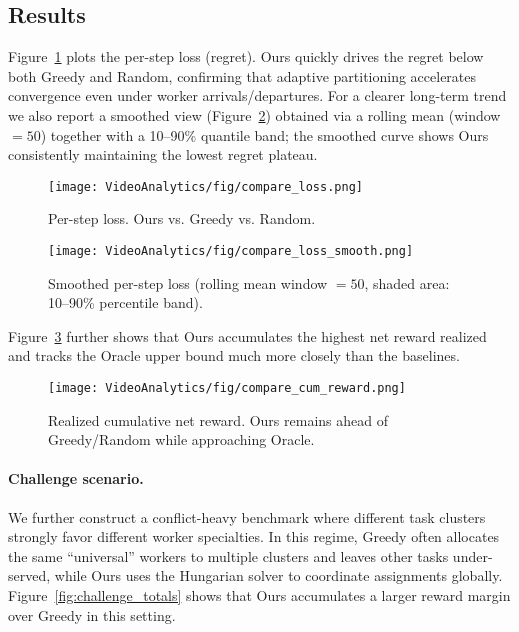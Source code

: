 \subsection{Results}

Figure~\ref{fig:loss} plots the per-step loss (regret). Ours quickly drives the regret below both Greedy and Random, confirming that adaptive partitioning accelerates convergence even under worker arrivals/departures. For a clearer long-term trend we also report a smoothed view (Figure~\ref{fig:loss_smooth}) obtained via a rolling mean (window $=50$) together with a 10--90\% quantile band; the smoothed curve shows Ours consistently maintaining the lowest regret plateau.

\begin{figure}[t]
\centering
\texttt{[image: VideoAnalytics/fig/compare\_loss.png]}
\caption{Per-step loss. Ours vs. Greedy vs. Random.}
\label{fig:loss}
\end{figure}

\begin{figure}[t]
\centering
\texttt{[image: VideoAnalytics/fig/compare\_loss\_smooth.png]}
\caption{Smoothed per-step loss (rolling mean window $=50$, shaded area: 10--90\% percentile band).}
\label{fig:loss_smooth}
\end{figure}

Figure~\ref{fig:cum} further shows that Ours accumulates the highest net reward realized and tracks the Oracle upper bound much more closely than the baselines.

\begin{figure}[t]
\centering
\texttt{[image: VideoAnalytics/fig/compare\_cum\_reward.png]}
\caption{Realized cumulative net reward. Ours remains ahead of Greedy/Random while approaching Oracle.}
\label{fig:cum}
\end{figure}

\paragraph{Challenge scenario.}\label{sec:challenge}
We further construct a conflict-heavy benchmark where different task clusters strongly favor different worker specialties. In this regime, Greedy often allocates the same “universal” workers to multiple clusters and leaves other tasks under-served, while Ours uses the Hungarian solver to coordinate assignments globally. Figure~\ref{fig:challenge_totals} shows that Ours accumulates a larger reward margin over Greedy in this setting.

